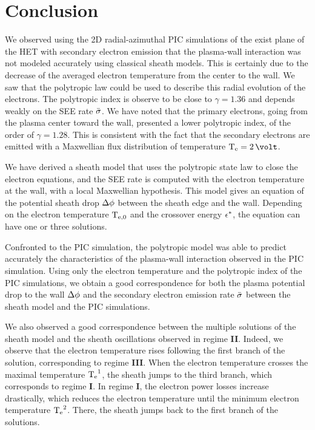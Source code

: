 

\section{Conclusion} \label{subsec-concuslion_ch4}

We observed using the \ac{2D} radial-azimuthal \ac{PIC} simulations of the exist plane of the \ac{HET} with secondary electron emission that the plasma-wall interaction was not modeled accurately using classical sheath models.
This is certainly due to the decrease of the averaged electron temperature from the center to the wall.
We saw that the polytropic law could be used to describe this radial evolution of the electrons.
The polytropic index is observe to be close to $\gamma=1.36$ and depends weakly on the \ac{SEE} rate $ \bar{\sigma }$.
We have noted that the primary electrons, going from the plasma center toward the wall, presented a lower polytropic index, of the order of $\gamma=1.28$.
This is consistent with the fact that the secondary electrons are emitted with a Maxwellian flux distribution of temperature $\Te=2\,\volt$.

We have derived a sheath model that uses the polytropic state law to close the electron equations, and the \ac{SEE} rate is computed with the electron temperature at the wall, with a local Maxwellian hypothesis.
This model gives an equation of the potential sheath drop $\Delta \phi$ between the sheath edge and the wall.
Depending on the electron temperature $\mathrm{T_{e, 0}}$ and the crossover energy $\epsilon^{*}$, the equation can have one or three solutions.

Confronted to the \ac{PIC} simulation, the polytropic model was able to predict accurately the characteristics of the plasma-wall interaction observed in the \ac{PIC} simulation.
Using only the electron temperature and the polytropic index of the \ac{PIC} simulations, we obtain a good correspondence for both the plasma potential drop to the wall $\Delta \phi$ and the secondary electron emission rate $ \bar{\sigma }$ between the sheath model and the \ac{PIC} simulations.

We also observed a good correspondence between the multiple solutions of the sheath model and the sheath oscillations observed in regime {\bf II}.
Indeed, we observe that the electron temperature rises following the first branch of the solution, corresponding to regime {\bf III}.
When the electron temperature crosses the maximal temperature $\mathrm{T_e}^1$, the sheath jumps to the third branch, which corresponds to regime {\bf I}.
In regime {\bf I}, the electron power losses increase drastically, which reduces the electron temperature until the minimum electron temperature $\mathrm{T_e}^2$.
There, the sheath jumps back to the first branch of the solutions.

